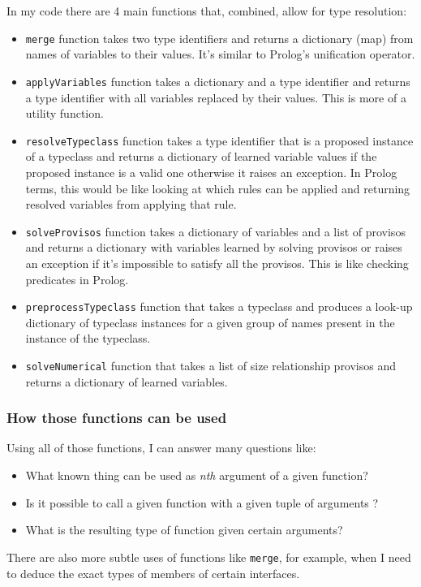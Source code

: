 \documentclass[12pt]{report}
\begin{document}
\par
In my code there are 4 main functions that, combined, allow for type resolution:
\begin{itemize}
    \item \verb!merge! function takes two type identifiers and returns a dictionary (map) from names of variables to their values. It's similar to Prolog's unification operator.
    \item \verb!applyVariables! function takes a dictionary and a type identifier and returns a type identifier with all variables replaced by their values. This is more of a utility function.
    \item \verb!resolveTypeclass! function takes a type identifier that is a proposed instance of a typeclass and returns a dictionary of learned variable values if the proposed instance is a valid one otherwise it raises an exception. In Prolog terms, this would be like looking at which rules can be applied and returning resolved variables from applying that rule.
    \item \verb!solveProvisos! function takes a dictionary of variables and a list of provisos and returns a dictionary with variables learned by solving provisos or raises an exception if it's impossible to satisfy all the provisos. This is like checking predicates in Prolog.
    \item \verb!preprocessTypeclass! function that takes a typeclass and produces a look-up dictionary of typeclass instances for a given group of names present in the instance of the typeclass.
    \item \verb!solveNumerical! function that takes a list of size relationship provisos and returns a dictionary of learned variables.
\end{itemize}
\subsubsection{How those functions can be used}
Using all of those functions, I can answer many questions like:
\begin{itemize}
    \item What known thing can be used as \emph{nth} argument of a given function?
    \item Is it possible to call a given function with a given tuple of arguments ?
    \item What is the resulting type of function given certain arguments?
\end{itemize}
There are also more subtle uses of functions like \verb!merge!, for example, when I need to deduce the exact types of members of certain interfaces.
\end{document}
